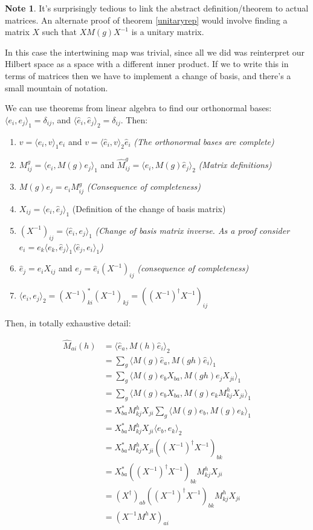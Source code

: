 \documentclass[12pt, letterpaper]{article}
\theoremstyle{definition} %
\newtheorem{note}[thm]{Note}
\begin{document}
\begin{note}
  It's surprisingly tedious to link the abstract definition/theorem to actual matrices. An
  alternate proof of theorem \ref{unitaryrep} would involve finding a matrix $X$ such
  that $X M(g) X^{-1}$ is a unitary matrix.

  In this case the intertwining map was trivial, since all we did was reinterpret our Hilbert space as a space with a different inner product.
  If we to write this in terms of matrices then we have to implement a change of basis, and there's a small mountain of notation.

  We can use theorems from linear algebra to find our orthonormal bases: $\langle e_i,e_j\rangle_1=\delta_{ij}$, 
  and $\langle \hat{e}_i,\hat{e}_j\rangle_2=\delta_{ij}$. Then:
  
  \begin{enumerate}
    \item $v=\langle e_i,v\rangle_1 e_i$ and $v=\langle \hat{e}_i,v\rangle_2 \hat{e}_i$ \emph{(The orthonormal bases are complete)}
    \item $M_{ij}^g=\langle e_i,M(g) e_j\rangle_1$ and $\hat{M}^g_{ij}=\langle \hat{e}_i,M(g)\hat{e}_j\rangle_2$ \emph{(Matrix definitions)}
    \item $M(g) e_j=e_i M_{ij}^g$ \emph{(Consequence of completeness)}
    \item $X_{ij}=\langle e_i,\hat{e}_j\rangle_1$ (Definition of the change of basis matrix)
    \item $(X^{-1})_{ij}=\langle \hat{e}_i,e_j\rangle_1$ \emph{(Change of basis matrix inverse. As a proof consider $e_i=e_k\langle e_k,\hat{e}_j\rangle_1\langle \hat{e}_j,e_i\rangle_1$)}
    \item $\hat{e}_j=e_i X_{ij}$ and $e_j=\hat{e}_i (X^{-1})_{ij}$ \emph{(consequence of completeness)}
    \item $\langle e_i,e_j\rangle_2=(X^{-1})_{ki}^* (X^{-1})_{kj}=((X^{-1})^\dagger X^{-1})_{ij}$
  \end{enumerate}

  Then, in totally exhaustive detail:

  \begin{align*}
    \hat{M}_{ai}(h)&=\langle \hat{e}_a, M(h)\hat{e}_i\rangle_2\\
    &=\sum_g\langle M(g)\hat{e}_a,M(gh)\hat{e}_i\rangle_1\\
    &=\sum_g\langle M(g)e_b X_{ba},M(gh)e_j X_{ji}\rangle_1\\
    &=\sum_g\langle M(g)e_b X_{ba},M(g)e_kM^h_{kj} X_{ji}\rangle_1\\
    &=X_{ba}^*M^h_{kj}X_{ji}\sum_g\langle M(g)e_b,M(g)e_k\rangle_1\\
    &=X_{ba}^*M^h_{kj}X_{ji}\langle e_b,e_k\rangle_2 \\
    &=X_{ba}^*M^h_{kj}X_{ji}((X^{-1})^\dagger X^{-1})_{bk} \\
    &=X_{ba}^*((X^{-1})^\dagger X^{-1})_{bk}M^h_{kj}X_{ji} \\
    &=(X^\dagger)_{ab}((X^{-1})^\dagger X^{-1})_{bk}M^h_{kj}X_{ji} \\
    &=(X^{-1}M^hX)_{ai}
  \end{align*}
\end{note}
\end{document}
